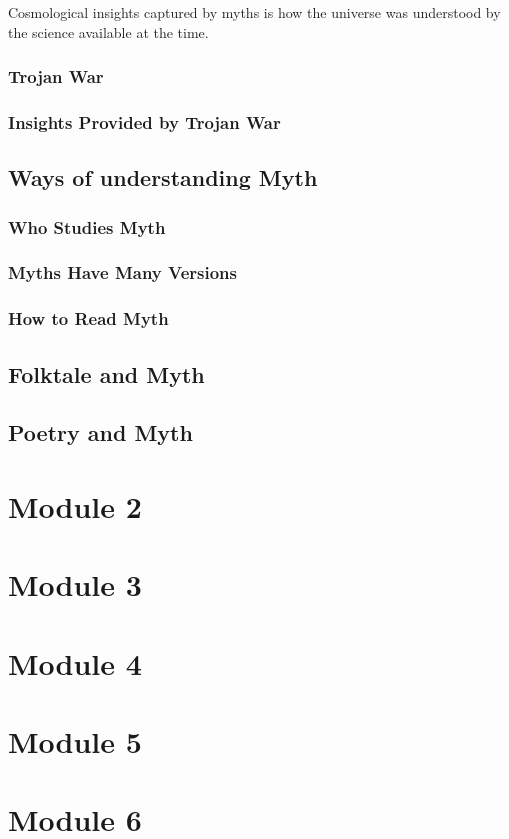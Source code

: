 \documentclass{article}
\begin{document}
Cosmological insights captured by myths is how the universe was understood by the science available at the time.

\subsubsection{Trojan War}

\subsubsection{Insights Provided by Trojan War}

\subsection{Ways of understanding Myth}

\subsubsection{Who Studies Myth}

\subsubsection{Myths Have Many Versions}

\subsubsection{How to Read Myth}

\subsection{Folktale and Myth}

\subsection{Poetry and Myth}

\section{Module 2}
\section{Module 3}
\section{Module 4}
\section{Module 5}
\section{Module 6}
\end{document}
